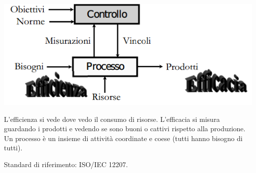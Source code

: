 \begin{center}

\includegraphics[width=0.75\columnwidth]{img2} %

\end{center}

L'efficienza si vede dove vedo il consumo di risorse. L'efficacia si misura guardando i prodotti e vedendo se sono buoni o cattivi rispetto alla produzione. Un processo è un insieme di attività coordinate e coese (tutti hanno bisogno di tutti).

Standard di riferimento: ISO/IEC 12207.